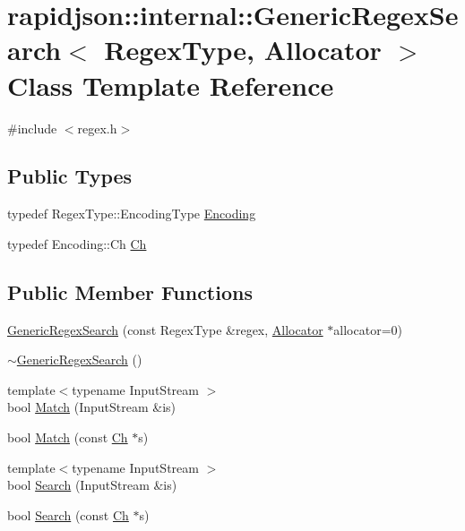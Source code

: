 \hypertarget{classrapidjson_1_1internal_1_1_generic_regex_search}{}\section{rapidjson\+::internal\+::Generic\+Regex\+Search$<$ Regex\+Type, Allocator $>$ Class Template Reference}
\label{classrapidjson_1_1internal_1_1_generic_regex_search}


{\ttfamily \#include $<$regex.\+h$>$}

\subsection*{Public Types}
\begin{DoxyCompactItemize}
\item 
typedef Regex\+Type\+::\+Encoding\+Type \mbox{\hyperlink{classrapidjson_1_1internal_1_1_generic_regex_search_a826672f13e4f2b5e075cc00e6c871874}{Encoding}}
\item 
typedef Encoding\+::\+Ch \mbox{\hyperlink{classrapidjson_1_1internal_1_1_generic_regex_search_a3d4c81f49677604f40b1c09c4fc0a958}{Ch}}
\end{DoxyCompactItemize}
\subsection*{Public Member Functions}
\begin{DoxyCompactItemize}
\item 
\mbox{\hyperlink{classrapidjson_1_1internal_1_1_generic_regex_search_abcdf4718410c956bbb410b68c27d72db}{Generic\+Regex\+Search}} (const Regex\+Type \&regex, \mbox{\hyperlink{classrapidjson_1_1_allocator}{Allocator}} $\ast$allocator=0)
\item 
\mbox{\hyperlink{classrapidjson_1_1internal_1_1_generic_regex_search_af607e7a503906487a76fae20d98df511}{$\sim$\+Generic\+Regex\+Search}} ()
\item 
{\footnotesize template$<$typename Input\+Stream $>$ }\\bool \mbox{\hyperlink{classrapidjson_1_1internal_1_1_generic_regex_search_ab793f6f4e0e2065cfc1e03eae844a392}{Match}} (Input\+Stream \&is)
\item 
bool \mbox{\hyperlink{classrapidjson_1_1internal_1_1_generic_regex_search_ab1011ef61e8000808a4321c9f7399ffb}{Match}} (const \mbox{\hyperlink{classrapidjson_1_1internal_1_1_generic_regex_search_a3d4c81f49677604f40b1c09c4fc0a958}{Ch}} $\ast$s)
\item 
{\footnotesize template$<$typename Input\+Stream $>$ }\\bool \mbox{\hyperlink{classrapidjson_1_1internal_1_1_generic_regex_search_a7d048ecaaad22d0bdfa2d093dd7fcc42}{Search}} (Input\+Stream \&is)
\item 
bool \mbox{\hyperlink{classrapidjson_1_1internal_1_1_generic_regex_search_ab5c5a7346d4b7a05323ac587662200a3}{Search}} (const \mbox{\hyperlink{classrapidjson_1_1internal_1_1_generic_regex_search_a3d4c81f49677604f40b1c09c4fc0a958}{Ch}} $\ast$s)
\end{DoxyCompactItemize}
